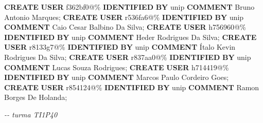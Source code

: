 \documentclass[
]{book}
\newenvironment{Shaded}{\begin{snugshade}}{\end{snugshade}}
\newcommand{\CommentTok}[1]{\textcolor[rgb]{0.56,0.35,0.01}{\textit{#1}}}
\newcommand{\FunctionTok}[1]{\textcolor[rgb]{0.13,0.29,0.53}{\textbf{#1}}}
\newcommand{\KeywordTok}[1]{\textcolor[rgb]{0.13,0.29,0.53}{\textbf{#1}}}
\newcommand{\NormalTok}[1]{#1}
\newcommand{\StringTok}[1]{\textcolor[rgb]{0.31,0.60,0.02}{#1}}
\begin{document}
\begin{Shaded}
\begin{Highlighting}[]
\KeywordTok{CREATE} \FunctionTok{USER} \StringTok{\textquotesingle{}f362bf0\textquotesingle{}}\NormalTok{@}\StringTok{\textquotesingle{}\%\textquotesingle{}} \KeywordTok{IDENTIFIED} \KeywordTok{BY} \StringTok{\textquotesingle{}unip\textquotesingle{}} \KeywordTok{COMMENT}  \StringTok{\textquotesingle{}Bruno Antonio Marques\textquotesingle{}}\NormalTok{;}
\KeywordTok{CREATE} \FunctionTok{USER} \StringTok{\textquotesingle{}r536fa6\textquotesingle{}}\NormalTok{@}\StringTok{\textquotesingle{}\%\textquotesingle{}} \KeywordTok{IDENTIFIED} \KeywordTok{BY} \StringTok{\textquotesingle{}unip\textquotesingle{}} \KeywordTok{COMMENT}  \StringTok{\textquotesingle{}Caio Cesar Balbino Da Silva\textquotesingle{}}\NormalTok{;}
\KeywordTok{CREATE} \FunctionTok{USER} \StringTok{\textquotesingle{}h756960\textquotesingle{}}\NormalTok{@}\StringTok{\textquotesingle{}\%\textquotesingle{}} \KeywordTok{IDENTIFIED} \KeywordTok{BY} \StringTok{\textquotesingle{}unip\textquotesingle{}} \KeywordTok{COMMENT}  \StringTok{\textquotesingle{}Heder Rodrigues Da Silva\textquotesingle{}}\NormalTok{;}
\KeywordTok{CREATE} \FunctionTok{USER} \StringTok{\textquotesingle{}r8133g7\textquotesingle{}}\NormalTok{@}\StringTok{\textquotesingle{}\%\textquotesingle{}} \KeywordTok{IDENTIFIED} \KeywordTok{BY} \StringTok{\textquotesingle{}unip\textquotesingle{}} \KeywordTok{COMMENT}  \StringTok{\textquotesingle{}Ítalo Kevin Rodrigues Da Silva\textquotesingle{}}\NormalTok{;}
\KeywordTok{CREATE} \FunctionTok{USER} \StringTok{\textquotesingle{}r837aa0\textquotesingle{}}\NormalTok{@}\StringTok{\textquotesingle{}\%\textquotesingle{}} \KeywordTok{IDENTIFIED} \KeywordTok{BY} \StringTok{\textquotesingle{}unip\textquotesingle{}} \KeywordTok{COMMENT}  \StringTok{\textquotesingle{}Lucas Souza Rodrigues\textquotesingle{}}\NormalTok{;}
\KeywordTok{CREATE} \FunctionTok{USER} \StringTok{\textquotesingle{}h714419\textquotesingle{}}\NormalTok{@}\StringTok{\textquotesingle{}\%\textquotesingle{}} \KeywordTok{IDENTIFIED} \KeywordTok{BY} \StringTok{\textquotesingle{}unip\textquotesingle{}} \KeywordTok{COMMENT}  \StringTok{\textquotesingle{}Marcos Paulo Cordeiro Goes\textquotesingle{}}\NormalTok{;}
\KeywordTok{CREATE} \FunctionTok{USER} \StringTok{\textquotesingle{}r854124\textquotesingle{}}\NormalTok{@}\StringTok{\textquotesingle{}\%\textquotesingle{}} \KeywordTok{IDENTIFIED} \KeywordTok{BY} \StringTok{\textquotesingle{}unip\textquotesingle{}} \KeywordTok{COMMENT}  \StringTok{\textquotesingle{}Ramon Borges De Holanda\textquotesingle{}}\NormalTok{;}

\CommentTok{{-}{-} turma TI1P40}


\end{Highlighting}
\end{Shaded}
\end{document}
